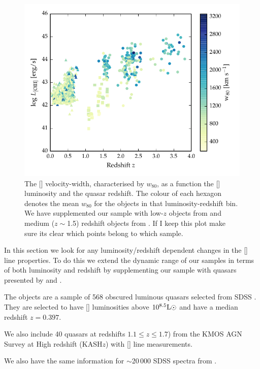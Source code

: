 \begin{figure}
    \includegraphics[width=\columnwidth]{figures/chapter04/oiii_luminosity_z_w80.pdf} 
    \caption{The [] velocity-width, characterised by $w_{80}$, as a function the [] luminosity and the quasar redshift. The colour of each hexagon denotes the mean $w_{80}$ for the objects in that luminosity-redshift bin. We have supplemented our sample with low-$z$ objects from \citet{zakamska14} and medium ($z\sim$1.5) redshift objects from \citet{harrison16}. If I keep this plot make sure its clear which points belong to which sample.}       
    \label{fig:oiii_luminosity_z_w80}
\end{figure}

In this section we look for any luminosity/redshift dependent changes in the [] line properties. 
To do this we extend the dynamic range of our samples in terms of both luminosity and redshift by supplementing our sample with quasars presented by \citet{zakamska14} and \citet{harrison16}. 

The \citet{zakamska14} objects are a sample of 568 obscured luminous quasars selected from \ac{SDSS} \citep{reyes08,yuan16}. 
They are selected to have [] luminosities above $10^{8.5}{\rm L}\odot$ and have a median redshift $z=0.397$. 

We also include 40 quasars at redshifts $1.1 \leq z \leq 1.7$) from the KMOS \ac{AGN} Survey at High redshift (KASH$z$) with [] line measurements. 

We also have the same information for $\sim$20\,000 \ac{SDSS} spectra from \citet{mullaney13}. 

